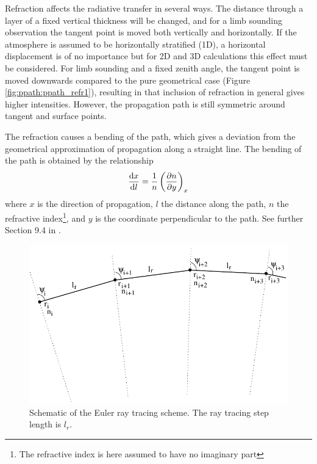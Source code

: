 Refraction affects the radiative transfer in several ways. The
distance through a layer of a fixed vertical thickness will be
changed, and for a limb sounding observation the tangent point is
moved both vertically and horizontally. If the atmosphere is assumed
to be horizontally stratified (1D), a horizontal displacement is of no
importance but for 2D and 3D calculations this effect must be
considered. For limb sounding and a fixed zenith angle, the tangent
point is moved downwards compared to the pure geometrical case
(Figure \ref{fig:ppath:ppath_refr1}), resulting in that inclusion of
refraction in general gives higher intensities. However, the
propagation path is still symmetric around tangent and surface points.

The refraction causes a bending of the path, which gives a deviation
from the geometrical approximation of propagation along a straight
line. The bending of the path is obtained by the relationship
\begin{equation}
  \frac{\mathrm{d} x}{\mathrm{d} l} = \frac{1}{n} \left( \frac{\partial n}{\partial y} \right)_x
  \label{eq:ppath:refrbend}
\end{equation}
where $x$ is the direction of propagation, $l$ the distance along the
path, $n$ the refractive index\footnote{The refractive index is here
  assumed to have no imaginary part}, and $y$ is the coordinate
perpendicular to the path. See further Section 9.4 in
\citet{rodgers:00}.

\begin{figure}
 \begin{center}
  \includegraphics*{euler}
  \caption{Schematic of the Euler ray tracing scheme. The ray tracing step 
    length is $l_r$. }
  \label{fig:ppath:euler}  
 \end{center}
\end{figure}

